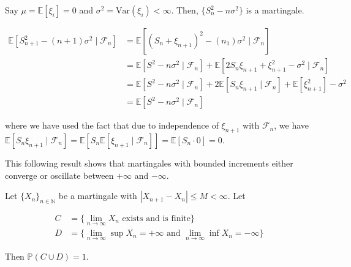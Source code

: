 \documentclass{article}
\begin{document}
  \begin{example}
  Say $\mu = \mathbb{E}[\xi_i] = 0$ and $\sigma^2 = \mathrm{Var}(\xi_i) < \infty$. Then, $\{S_n^2 - n \sigma^2\}$ is a martingale. 

  \begin{align*}
    \mathbb{E}[S_{n+1}^2 - (n + 1) \sigma^2 \mid \mathcal{F}_n] & = \mathbb{E}[ (S_n + \xi_{n+1})^2 - (n _ 1) \sigma^2 \mid \mathcal{F}_n] \\
    & = \mathbb{E}[S^2 - n \sigma^2 \mid \mathcal{F}_n ] + \mathbb{E}[ 2 S_n \xi_{n+1} + \xi_{n+1}^2 - \sigma^2 \mid \mathcal{F}_n] \\
    & = \mathbb{E}[S^2 - n \sigma^2 \mid \mathcal{F}_n ] + 2 \mathbb{E}[ S_n \xi_{n+1} \mid \mathcal{F}_n ] + \mathbb{E}[\xi_{n+1}^2] - \sigma^2  \\
    & = \mathbb{E}[S^2 - n \sigma^2 \mid \mathcal{F}_n ]
  \end{align*}

  where we have used the fact that due to independence of $\xi_{n+1}$ with $\mathcal{F}_n$, we have $\mathbb{E}[S_n \xi_{n+1} \mid \mathcal{F}_n] = \mathbb{E}[S_n \mathbb{E}[ \xi_{n+1} \mid \mathcal{F}_n]] = \mathbb{E}[S_n \cdot 0] = 0$. 
  \end{example}

  This following result shows that martingales with bounded increments either converge or oscillate between $+\infty$ and $-\infty$. 

  \begin{theorem}
    Let $\{X_n\}_{n \in \mathbb{N}}$ be a martingale with $|X_{n+1} - X_n| \leq M < \infty$. Let 

    \begin{align*}
      C & = \{\lim_{n \rightarrow \infty} X_n \text{ exists and is finite}\} \\
      D & = \{\lim_{n \rightarrow \infty} \sup X_n = +\infty \text{ and } \lim_{n \rightarrow \infty} \inf X_n = -\infty\}
    \end{align*}

    Then $\mathbb{P}(C \cup D) = 1$. 
  \end{theorem}
\end{document}
